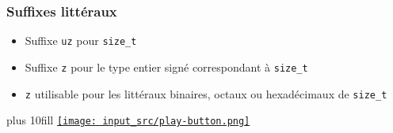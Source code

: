 \documentclass[C++.tex]{subfiles}
\begin{document}
\begin{frame}[fragile]
	\frametitle{Suffixes littéraux}
	\begin{itemize}
		\item Suffixe \lstinline|uz| pour \lstinline|size_t|


		\item Suffixe \lstinline|z| pour le type entier signé correspondant à \lstinline|size_t|


		\item \lstinline|z| utilisable pour les littéraux binaires, octaux ou hexadécimaux de \lstinline|size_t|
	\end{itemize}

	\vskip 10mm plus 10fill
	\hfill
	\href{https://godbolt.org/#g:!((g:!((g:!((h:codeEditor,i:(filename:'1',fontScale:14,fontUsePx:'0',j:1,lang:c%2B%2B,selection:(endColumn:1,endLineNumber:15,positionColumn:1,positionLineNumber:15,selectionStartColumn:1,selectionStartLineNumber:1,startColumn:1,startLineNumber:1),source:'%23include+%3Ciostream%3E%0A%23include+%3Ctypeinfo%3E%0A%0Aint+main()%0A%7B%0A++auto+i+%3D+5uz%3B%0A++auto+j+%3D+5z%3B%0A%0A++std::cout+%3C%3C+std::boolalpha%3B%0A++std::cout+%3C%3C+(typeid(i)+%3D%3D+typeid(size_t))+%3C%3C+%22%5Cn%22%3B%0A++std::cout+%3C%3C+(typeid(i)+%3D%3D+typeid(int))+%3C%3C+%22%5Cn%22%3B%0A++std::cout+%3C%3C+(typeid(j)+%3D%3D+typeid(size_t))+%3C%3C+%22%5Cn%22%3B%0A++std::cout+%3C%3C+(typeid(j)+%3D%3D+typeid(ptrdiff_t))+%3C%3C+%22%5Cn%22%3B%0A%7D%0A'),l:'5',n:'0',o:'C%2B%2B+source+%231',t:'0')),k:50,l:'4',n:'0',o:'',s:0,t:'0'),(g:!((h:executor,i:(argsPanelShown:'1',compilationPanelShown:'0',compiler:g122,compilerName:'',compilerOutShown:'0',execArgs:'',execStdin:'',fontScale:14,fontUsePx:'0',j:1,lang:c%2B%2B,libs:!((name:boost,ver:'175')),options:'-std%3Dc%2B%2B23+-Wall+-Wextra+-pedantic',source:1,stdinPanelShown:'1',tree:'1',wrap:'0'),l:'5',n:'0',o:'Executor+x86-64+gcc+12.2+(C%2B%2B,+Editor+%231)',t:'0')),header:(),k:50,l:'4',n:'0',o:'',s:0,t:'0')),l:'2',n:'0',o:'',t:'0')),version:4}{\texttt{[image: input\_src/play-button.png]}}
\end{frame}
\end{document}
